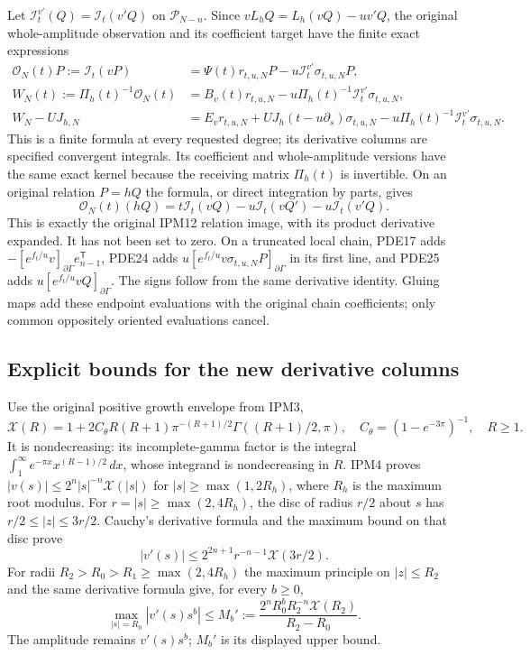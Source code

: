 Let $\mathcal I_t^{v'}(Q)=\mathcal I_t(v'Q)$ on
$\mathcal P_{N-n}$. Since
$vL_hQ=L_h(vQ)-u v'Q$, the original whole-amplitude observation and
its coefficient target have the finite exact expressions
\[
 \begin{split}
 \mathcal O_N(t)P:=\mathcal I_t(vP)
    &=\Psi(t)r_{t,u,N}P-u\mathcal I_t^{v'}\sigma_{t,u,N}P,\\
 W_N(t):=\Pi_h(t)^{-1}\mathcal O_N(t)
    &=B_v(t)r_{t,u,N}
                  -u\Pi_h(t)^{-1}\mathcal I_t^{v'}\sigma_{t,u,N},\\
 W_N-UJ_{h,N}
    &=E_vr_{t,u,N}+U J_h(t-u\partial_s)\sigma_{t,u,N}
                  -u\Pi_h(t)^{-1}\mathcal I_t^{v'}\sigma_{t,u,N}.
 \end{split}
 \tag{PDE24}
\]
This is a finite formula at every requested degree; its derivative
columns are specified convergent integrals. Its coefficient and
whole-amplitude versions have the same exact kernel because the
receiving matrix $\Pi_h(t)$ is invertible. On an original relation
$P=hQ$ the formula, or direct integration by parts, gives
\[
 \mathcal O_N(t)(hQ)
       =t\mathcal I_t(vQ)-u\mathcal I_t(vQ')-u\mathcal I_t(v'Q).
 \tag{PDE25}
\]
This is exactly the original IPM12 relation image, with its product
derivative expanded. It has not been set to zero. On a truncated
local chain, PDE17 adds $-[e^{f_t/u}v]_{\partial\Gamma}
e_{n-1}^{\mathsf T}$, PDE24 adds
$u[e^{f_t/u}v\sigma_{t,u,N}P]_{\partial\Gamma}$ in its first line,
and PDE25 adds $u[e^{f_t/u}vQ]_{\partial\Gamma}$.
The signs follow from the same derivative identity. Gluing maps add
these endpoint evaluations with the original chain coefficients;
only common oppositely oriented evaluations cancel.

\subsection{Explicit bounds for the new derivative columns}

Use the original positive growth envelope from IPM3,
\[
 \mathcal X(R)=1+2C_\theta R(R+1)\pi^{-(R+1)/2}
                          \Gamma((R+1)/2,\pi),\quad
 C_\theta=(1-e^{-3\pi})^{-1},\quad R\geq1.
 \tag{PDE26}
\]
It is nondecreasing: its incomplete-gamma factor is the integral
$\int_1^\infty e^{-\pi x}x^{(R-1)/2}\,dx$, whose integrand is
nondecreasing in $R$. IPM4 proves
$|v(s)|\leq2^n|s|^{-n}\mathcal X(|s|)$ for
$|s|\geq\max(1,2R_h)$, where $R_h$ is the maximum root modulus.
For $r=|s|\geq\max(2,4R_h)$, the disc of radius $r/2$ about $s$
has $r/2\leq|z|\leq3r/2$. Cauchy's derivative formula and the
maximum bound on that disc prove
\[
 |v'(s)|\leq 2^{2n+1}r^{-n-1}\mathcal X(3r/2).
 \tag{PDE27}
\]
For radii $R_2>R_0>R_1\geq\max(2,4R_h)$ the maximum principle on
$|z|\leq R_2$ and the same derivative formula give, for every $b\geq0$,
\[
 \max_{|s|=R_0}|v'(s)s^b|
      \leq M_b'
      :=\frac{2^nR_0^b R_2^{-n}\mathcal X(R_2)}{R_2-R_0}.
 \tag{PDE28}
\]
The amplitude remains $v'(s)s^b$; $M_b'$ is its displayed upper bound.

